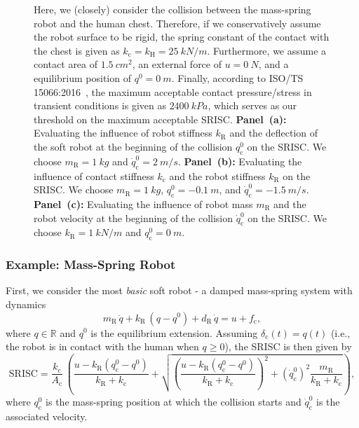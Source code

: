 \begin{figure}[ht!]
{        Here, we (closely) consider the collision between the mass-spring robot and the human chest. Therefore, if we conservatively assume the robot surface to be rigid, the spring constant of the contact with the chest is given as $k_\mathrm{c} = k_\mathrm{H} = \SI{25}{kN \per m}$. Furthermore, we assume a contact area of $\SI{1.5}{cm^2}$, an external force of $u=\SI{0}{N}$, and a equilibrium position of $q^0 = \SI{0}{m}$. Finally, according to ISO/TS 15066:2016~\citep{iso2016collaborative}, the maximum acceptable contact pressure/stress in transient conditions is given as $\SI{2400}{kPa}$, which serves as our threshold on the maximum acceptable \gls{SRISC}.
        \textbf{Panel~(a):} Evaluating the influence of robot stiffness $k_\mathrm{R}$ and the deflection of the soft robot at the beginning of the collision $q_\mathrm{c}^0$ on the \gls{SRISC}. We choose $m_\mathrm{R} = \SI{1}{kg}$ and $\dot{q}_\mathrm{c}^0 = \SI{2}{m/s}$.
        \textbf{Panel~(b):} Evaluating the influence of contact stiffness $k_\mathrm{c}$ and the robot stiffness $k_\mathrm{R}$ on the \gls{SRISC}. We choose $m_\mathrm{R} = \SI{1}{kg}$, $q_\mathrm{c}^0 = -\SI{0.1}{m}$, and $\dot{q}_\mathrm{c}^0 = -\SI{1.5}{m/s}$.
        \textbf{Panel~(c):} Evaluating the influence of robot mass $m_\mathrm{R}$ and the robot velocity at the beginning of the collision $\dot{q}_\mathrm{c}^0$ on the \gls{SRISC}. We choose $k_\mathrm{R} = \SI{1}{kN \per m}$ and $q_\mathrm{c}^0 = \SI{0}{m}$.
    }
    \label{fig:safetymetric:mass_spring_robot_characterization}
    \vspace{-0.2cm}
\end{figure}

\subsubsection{Example: Mass-Spring Robot}
First, we consider the most \emph{basic} soft robot - a damped mass-spring system with dynamics 
\begin{equation}
    m_\mathrm{R} \, \ddot{q} + k_\mathrm{R} \, (q-q^0) + d_\mathrm{R} \, \dot{q} = u + f_\mathrm{c},
\end{equation}
where $q \in \mathbb{R}$ and $q^0$ is the equilibrium extension. 
Assuming $\delta_\mathrm{c}(t) = q(t)$ (i.e., the robot is in contact with the human when $q \geq 0$), the \gls{SRISC} is then given by
\begin{equation}
     \mathrm{SRISC} = \frac{k_\mathrm{c}}{A_\mathrm{c}} \, \left (\frac{u - k_\mathrm{R} (q_{\mathrm{c}}^0 - q^0)}{k_\mathrm{R} + k_\mathrm{c}} + \sqrt{\left ( \frac{u - k_\mathrm{R} (q_{\mathrm{c}}^0 - q^0)}{k_\mathrm{R} + k_\mathrm{c}} \right )^2 + \left (\dot{q}_\mathrm{c}^0 \right )^2 \frac{m_\mathrm{R}}{k_\mathrm{R} + k_\mathrm{c}} } \right ),
\end{equation}
where $q_{\mathrm{c}}^0$ is the mass-spring position at which the collision starts and $\dot{q}_\mathrm{c}^0$ is the associated velocity.

